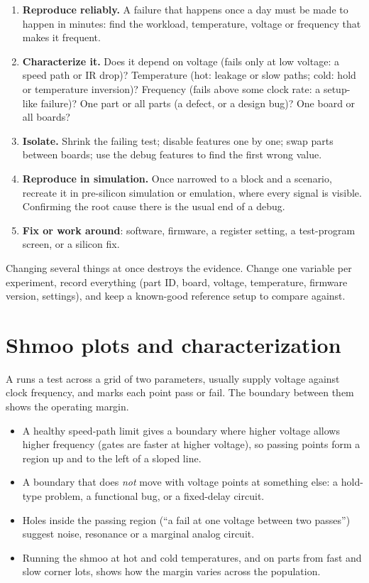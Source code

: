 \begin{enumerate}
  \item \textbf{Reproduce reliably.} A failure that happens once a day must be made to happen in minutes: find the workload, temperature, voltage or frequency that makes it frequent.
  \item \textbf{Characterize it.} Does it depend on voltage (fails only at low voltage: a speed path or IR drop)? Temperature (hot: leakage or slow paths; cold: hold or temperature inversion)? Frequency (fails above some clock rate: a setup-like failure)? One part or all parts (a defect, or a design bug)? One board or all boards?
  \item \textbf{Isolate.} Shrink the failing test; disable features one by one; swap parts between boards; use the debug features to find the first wrong value.
  \item \textbf{Reproduce in simulation.} Once narrowed to a block and a scenario, recreate it in pre-silicon simulation or emulation, where every signal is visible. Confirming the root cause there is the usual end of a debug.
  \item \textbf{Fix or work around}: software, firmware, a register setting, a test-program screen, or a silicon fix.
\end{enumerate}

\begin{trap}
Changing several things at once destroys the evidence. Change one variable per experiment, record everything (part ID, board, voltage, temperature, firmware version, settings), and keep a known-good reference setup to compare against.
\end{trap}

\section{Shmoo plots and characterization}

A  runs a test across a grid of two parameters, usually supply voltage against clock frequency, and marks each point pass or fail. The boundary between them shows the operating margin.

\begin{itemize}
  \item A healthy speed-path limit gives a boundary where higher voltage allows higher frequency (gates are faster at higher voltage), so passing points form a region up and to the left of a sloped line.
  \item A boundary that does \emph{not} move with voltage points at something else: a hold-type problem, a functional bug, or a fixed-delay circuit.
  \item Holes inside the passing region (``a fail at one voltage between two passes'') suggest noise, resonance or a marginal analog circuit.
  \item Running the shmoo at hot and cold temperatures, and on parts from fast and slow corner lots, shows how the margin varies across the population.
\end{itemize}

